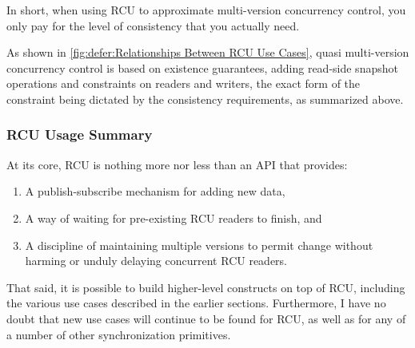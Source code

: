 In short, when using RCU to approximate multi-version concurrency control,
you only pay for the level of consistency that you actually need.

As shown in \cref{fig:defer:Relationships Between RCU Use Cases},
quasi multi-version concurrency control is based on existence guarantees,
adding read-side snapshot operations and constraints on readers and
writers, the exact form of the constraint being dictated by the
consistency requirements, as summarized above.

\subsubsection{RCU Usage Summary}
\label{sec:defer:RCU Usage Summary}

At its core, RCU is nothing more nor less than an API that provides:

\begin{enumerate}
\item	A publish-subscribe mechanism for adding new data,
\item	A way of waiting for pre-existing RCU readers to finish, and
\item	A discipline of maintaining multiple versions to permit change
	without harming or unduly delaying concurrent RCU readers.
\end{enumerate}

That said, it is possible to build higher-level constructs on top of RCU,
including the various use cases described in the earlier sections.
Furthermore, I have no doubt that new use cases will continue to be
found for RCU, as well as for any of a number of other synchronization
primitives.

\QuickQuizEnd

